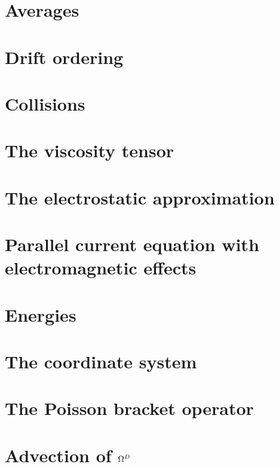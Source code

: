 \documentclass[12pt,a4paper,oneside,openright]{report} %
\begin{document}
\chapter{Averages}
\label{app:averages}


\chapter{Drift ordering}
\label{app:DO}


\chapter{Collisions}
\label{app:collisions}


\chapter{The viscosity tensor}
\label{app:piTensor}


\chapter{The electrostatic approximation}
\label{app:elstat}


\chapter{Parallel current equation with electromagnetic effects}
\label{app:elMag}


\chapter{Energies}
\label{app:energies}


\chapter{The coordinate system}
\label{app:coord}


\chapter{The Poisson bracket operator}
\label{app:poisson}


\chapter{Advection of \texorpdfstring{$\Omega^D$}{OmegaD}}
\label{app:vortDAdv}

\end{document}
